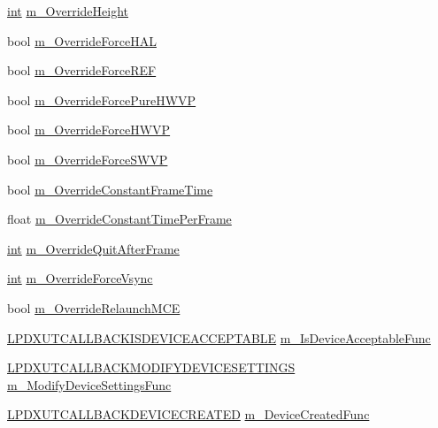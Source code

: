 \begin{DoxyCompactItemize}
\item 
\hyperlink{_d_x_u_tgui_8cpp_a2d77ed03302b6978834ee3b6f57837fb}{int} \hyperlink{struct_d_x_u_t_state_1_1_s_t_a_t_e_a35bf770a7ee5001a625025bf0261b40a}{m\_\-OverrideHeight}
\item 
bool \hyperlink{struct_d_x_u_t_state_1_1_s_t_a_t_e_a1d49bfeaa55b104f1e9a4c9a4977172b}{m\_\-OverrideForceHAL}
\item 
bool \hyperlink{struct_d_x_u_t_state_1_1_s_t_a_t_e_ad303cdc68cde81272db7e10bae2abc75}{m\_\-OverrideForceREF}
\item 
bool \hyperlink{struct_d_x_u_t_state_1_1_s_t_a_t_e_af05183feffd60f8e5d0c6ec929d71664}{m\_\-OverrideForcePureHWVP}
\item 
bool \hyperlink{struct_d_x_u_t_state_1_1_s_t_a_t_e_a97f4ffa477a42994f76af7afdec6cbb1}{m\_\-OverrideForceHWVP}
\item 
bool \hyperlink{struct_d_x_u_t_state_1_1_s_t_a_t_e_ad90ff779b6cd50b33548c4eaea23411d}{m\_\-OverrideForceSWVP}
\item 
bool \hyperlink{struct_d_x_u_t_state_1_1_s_t_a_t_e_a7b3dbd8785f83b4b951f2ac9bc4ac344}{m\_\-OverrideConstantFrameTime}
\item 
float \hyperlink{struct_d_x_u_t_state_1_1_s_t_a_t_e_a6daaef9eb029419d3e6d79ec28726ea6}{m\_\-OverrideConstantTimePerFrame}
\item 
\hyperlink{_d_x_u_tgui_8cpp_a2d77ed03302b6978834ee3b6f57837fb}{int} \hyperlink{struct_d_x_u_t_state_1_1_s_t_a_t_e_aa5103b0ca8d62a030121955138559a1c}{m\_\-OverrideQuitAfterFrame}
\item 
\hyperlink{_d_x_u_tgui_8cpp_a2d77ed03302b6978834ee3b6f57837fb}{int} \hyperlink{struct_d_x_u_t_state_1_1_s_t_a_t_e_a0eb13e60a693afbf28ab239d045e8800}{m\_\-OverrideForceVsync}
\item 
bool \hyperlink{struct_d_x_u_t_state_1_1_s_t_a_t_e_a6eac7a40b9e92ac2caeafc588c6416b8}{m\_\-OverrideRelaunchMCE}
\item 
\hyperlink{_d_x_u_t_8h_ae2d164ed8b3156b379e09db1cbead165}{LPDXUTCALLBACKISDEVICEACCEPTABLE} \hyperlink{struct_d_x_u_t_state_1_1_s_t_a_t_e_a43aeca1c7ecfdea54a03ec337cc78e03}{m\_\-IsDeviceAcceptableFunc}
\item 
\hyperlink{_d_x_u_t_8h_aece7ce83d66003e12aebe05c3ae22c09}{LPDXUTCALLBACKMODIFYDEVICESETTINGS} \hyperlink{struct_d_x_u_t_state_1_1_s_t_a_t_e_a721437e62eb11a7b5e2d193b50c5eee3}{m\_\-ModifyDeviceSettingsFunc}
\item 
\hyperlink{_d_x_u_t_8h_a359d98461cb8f9435379e46241716dc9}{LPDXUTCALLBACKDEVICECREATED} \hyperlink{struct_d_x_u_t_state_1_1_s_t_a_t_e_ac6df4c618ae04e33159561c861152417}{m\_\-DeviceCreatedFunc}

\end{DoxyCompactItemize}
